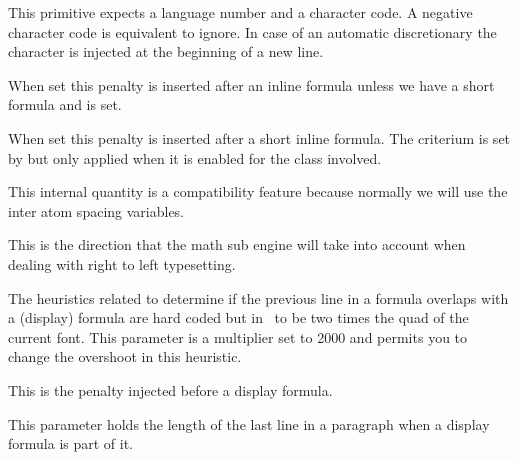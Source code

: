 This primitive expects a language number and a character code. A negative
character code is equivalent to ignore. In case of an automatic discretionary the
character is injected at the beginning of a new line.

\stopnewprimitive

\startnewprimitive[title={\prm {postinlinepenalty}}]

When set this penalty is inserted after an inline formula unless we have a short
formula and  is set.

\stopnewprimitive

\startnewprimitive[title={\prm {postshortinlinepenalty}}]

When set this penalty is inserted after a short inline formula. The criterium is
set by  but only applied when it is enabled for
the class involved.

\stopnewprimitive

\startnewprimitive[title={\prm {prebinoppenalty}}]

This internal quantity is a compatibility feature because normally we will use
the inter atom spacing variables.

\stopnewprimitive

\startoldprimitive[title={\prm {predisplaydirection}}]

This is the direction that the math sub engine will take into account when
dealing with right to left typesetting.

\stopoldprimitive

\startnewprimitive[title={\prm {predisplaygapfactor}}]

The heuristics related to determine if the previous line in a formula overlaps
with a (display) formula are hard coded but in \LUATEX\ to be two times the quad
of the current font. This parameter is a multiplier set to 2000 and permits you
to change the overshoot in this heuristic.

\stopnewprimitive

\startoldprimitive[title={\prm {predisplaypenalty}}]

This is the penalty injected before a display formula.

\stopoldprimitive

\startoldprimitive[title={\prm {predisplaysize}}]

This parameter holds the length of the last line in a paragraph when a display
formula is part of it.

\stopoldprimitive


